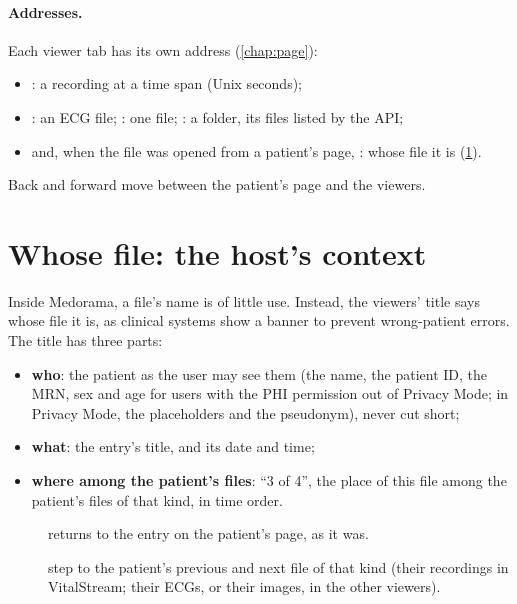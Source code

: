 \paragraph{Addresses.} Each viewer tab has its own address (\cref{chap:page}):
\begin{itemize}
\item {}: a recording at a time span (Unix
  seconds);
\item {}: an ECG file; : one file;
  : a folder, its files listed by the API;
\item and, when the file was opened from a patient's page,
  : whose file it is (\cref{sec:viewers-in-medorama-context}).
\end{itemize}
Back and forward move between the patient's page and the viewers.

\section{Whose file: the host's context}
\label{sec:viewers-in-medorama-context}

Inside Medorama, a file's name is of little use. Instead, the viewers' title says whose file it
is, as clinical systems show a banner to prevent wrong-patient errors. The title has three
parts:
\begin{itemize}
\item \textbf{who}: the patient as the user may see them (the name, the patient ID, the MRN,
  sex and age for users with the PHI permission out of Privacy Mode; in Privacy Mode, the
  placeholders and the pseudonym), never cut short;
\item \textbf{what}: the entry's title, and its date and time;
\item \textbf{where among the patient's files}: ``3 of 4'', the place of this file among the
  patient's files of that kind, in time order.
\end{itemize}

\begin{description}
\item[] returns to the entry on the patient's page, as it was.
\item[\ui{$\langle$} \ui{$\rangle$}] step to the patient's previous and next file of that kind
  (their recordings in VitalStream; their ECGs, or their images, in the other viewers).
\end{description}

